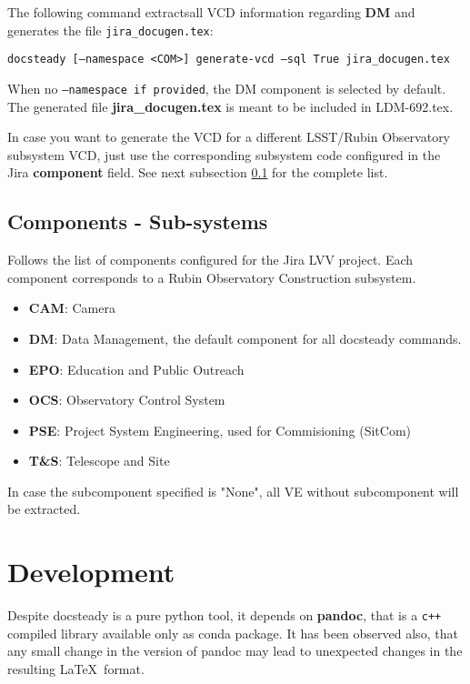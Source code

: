 \documentclass[DM]{lsstdoc}
\begin{document}
The following command extractsall VCD information regarding \textbf{DM} and generates the file \texttt{jira\_docugen.tex}:

\texttt{docsteady [--namespace <COM>] generate-vcd --sql True jira\_docugen.tex}

When no \texttt{--namespace if provided}, the DM component is selected by default.
The generated file \textbf{jira\_docugen.tex} is meant to be included in LDM-692.tex.

In case you want to generate the VCD for a different LSST/Rubin Observatory subsystem VCD,
just use the corresponding subsystem code configured in the Jira \textbf{component} field. 
See next subsection \ref{sec:components} for the complete list.


\subsection{Components - Sub-systems}\label{sec:components}

Follows the list of components configured for the Jira LVV project.
Each component corresponds to a Rubin Observatory Construction subsystem.

\begin{itemize}
\item \textbf{CAM}: Camera
\item \textbf{DM}: Data Management, the default component for all docsteady commands.
\item \textbf{EPO}: Education and Public Outreach
\item \textbf{OCS}: Observatory Control System
\item \textbf{PSE}: Project System Engineering, used for Commisioning (SitCom)
\item \textbf{T\&S}: Telescope and Site
\end{itemize}

In case the subcomponent specified is "None", all VE without subcomponent will be extracted.


\section{Development}
\label{sec:development}

Despite docsteady is a pure python tool, it depends on \textbf{pandoc}, that is a \texttt{c++} compiled library available only as conda package.
It has been observed also, that any small change in the version of pandoc may lead to unexpected changes in the resulting \LaTeX~format.
\end{document}

